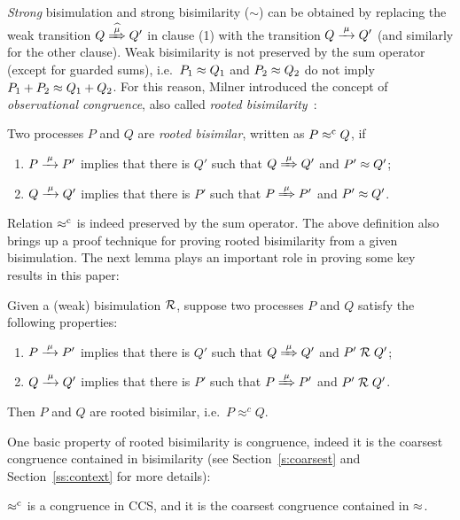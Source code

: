 \emph{Strong} bisimulation and strong bisimilarity ($\sim$)
can be obtained by replacing the weak transition $Q\Arcap\mu Q'$ in 
clause (1) 
 with the transition $Q \arr \mu Q'$ (and similarly for the other clause).
Weak bisimilarity is not preserved by the sum operator (except for
guarded sums), i.e.~$P_1 \approx Q_1$ and $P_2 \approx Q_2$ do not imply
 $P_1 + P_2 \approx Q_1 + Q_2$.
For this reason, Milner introduced the concept of
\emph{observational congruence}, also called \emph{rooted
  bisimilarity}~\cite{Gorrieri:2015jt,Sangiorgi:2011ut}:
\begin{definition}%
\label{d:rootedBisimilarity}
Two processes $P$ and $Q$ are \emph{rooted bisimilar}, written as $P
\mathrel{\approx^{\rm{c}}} Q$, if %
\begin{enumerate}
 \item  $P \arr\mu P'$ implies that there is $Q'$ such that $Q
   \Arr\mu Q'$ and $P' \approx Q'$;
 \item  $Q \arr\mu Q'$ implies that there is $P'$ such that $P
   \Arr\mu P'$ and $P' \approx Q'$\enspace.
\end{enumerate}
\end{definition}
Relation $\mathrel{\approx^{\rm{c}}}$ is indeed preserved by the sum operator.
The above definition also brings up a proof technique for proving rooted
bisimilarity from a given bisimulation. The next
lemma plays an
important role in proving some key results in this paper:
\begin{lemma}
\label{l:obsCongrByWeakBisim}
Given a (weak) bisimulation $\mathrel{\cal R}$, suppose two processes $P$ and $Q$
satisfy the following properties:
\begin{enumerate}
\item $P \arr\mu P'$ implies that there is $Q'$ such that $Q
   \Arr\mu Q'$ and $P' \mathrel{\cal R} Q'$;
\item $Q \arr\mu Q'$ implies that there is $P'$ such that $P
   \Arr\mu P'$ and $P' \mathrel{\cal R} Q'$.
\end{enumerate}
Then $P$ and $Q$ are rooted bisimilar, i.e.~$P \approx^c Q$.
\end{lemma}

One basic property of rooted bisimilarity is congruence, %
indeed it is  the coarsest congruence contained in bisimilarity
(see Section~\ref{s:coarsest} and Section~\ref{ss:context} for more details):
\begin{theorem}
\label{t:rapproxCongruence}
$\mathrel{\approx^{\rm{c}}}$ is a congruence in CCS, and it is the
coarsest congruence contained in $\approx$.
\end{theorem}

